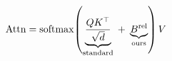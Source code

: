 \documentclass[preview]{standalone}
\begin{document}
\begin{align*}
\special{dvisvgm:raw <g id='unique000'>}\mathrm{Attn} = \mathrm{softmax}\!\left(\underbrace{\frac{Q K^{\top}}{\sqrt{d}}}_{\text{standard}}\;+\;\underbrace{B^{\mathrm{rel}}}_{\text{ours}}\right) V\special{dvisvgm:raw </g>}
\end{align*}
\end{document}
